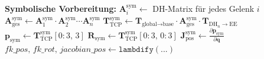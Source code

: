 \vspace{1em}
\begin{algorithm}[H]
    \caption{Iterative Inverse Kinematik mit symbolischem Vorwärtspfad und Gelenkwinkelgrenzen}
    \label{alg:inverse_kinematik}
    \begin{algorithmic}[1]
        \State \textbf{Symbolische Vorbereitung:}
        \State $\mathbf{A}_i^{\text{sym}} \gets$ DH-Matrix für jedes Gelenk $i$
        \State $\mathbf{A}_{\text{ges}}^{\text{sym}} \gets \mathbf{A}_1^{\text{sym}} \cdot \mathbf{A}_2^{\text{sym}} \cdots \mathbf{A}_n^{\text{sym}}$
        \State $\mathbf{T}_{\text{TCP}}^{\text{sym}} \gets \mathbf{T}_{\text{global} \rightarrow \text{base}} \cdot \mathbf{A}_{\text{ges}}^{\text{sym}} \cdot \mathbf{T}_{\text{DH}_n \rightarrow \text{EE}}$
        \State $\mathbf{p}_{\text{sym}} \gets \mathbf{T}_{\text{TCP}}^{\text{sym}}[0{:}3,\, 3]$
        \State $\mathbf{R}_{\text{sym}} \gets \mathbf{T}_{\text{TCP}}^{\text{sym}}[0{:}3,\, 0{:}3]$
        \State $\mathbf{J}_{\text{pos}}^{\text{sym}} \gets \frac{\partial \mathbf{p}_{\text{sym}}}{\partial \mathbf{q}}$
        \State $\mathit{fk\_pos},\, \mathit{fk\_rot},\, \mathit{jacobian\_pos} \gets \texttt{lambdify}(...)$


\end{algorithmic}
\end{algorithm}
